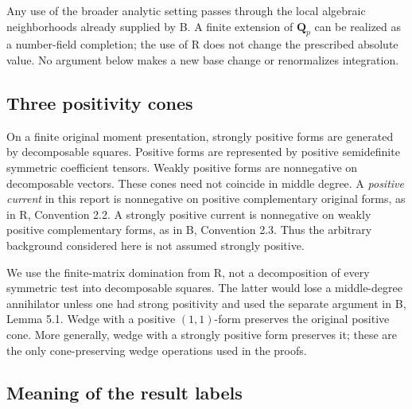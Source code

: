 \documentclass[11pt,a4paper]{article}
\numberwithin{equation}{section}
\theoremstyle{definition}
\theoremstyle{remark}
\begin{document}
Any use of the broader analytic setting passes through the local
algebraic neighborhoods already supplied by \textup{B}. A finite
extension of $\mathbf Q_p$ can be realized as a number-field completion;
the use of \textup{R} does not change the prescribed absolute value.
No argument below makes a new base change or renormalizes integration.

\subsection{Three positivity cones}

On a finite original moment presentation, strongly positive forms are
generated by decomposable squares. Positive forms are represented by
positive semidefinite symmetric coefficient tensors. Weakly positive
forms are nonnegative on decomposable vectors. These cones need not
coincide in middle degree. A \emph{positive current} in this report is
nonnegative on positive complementary original forms, as in
\textup{R}, Convention 2.2. A strongly positive current is nonnegative
on weakly positive complementary forms, as in \textup{B}, Convention
2.3. Thus the arbitrary background considered here is not assumed
strongly positive.

We use the finite-matrix domination from \textup{R}, not a decomposition
of every symmetric test into decomposable squares. The latter would
lose a middle-degree annihilator unless one had strong positivity and
used the separate argument in \textup{B}, Lemma 5.1. Wedge with a
positive $(1,1)$-form preserves the original positive cone. More
generally, wedge with a strongly positive form preserves it; these are
the only cone-preserving wedge operations used in the proofs.

\subsection{Meaning of the result labels}
\end{document}
